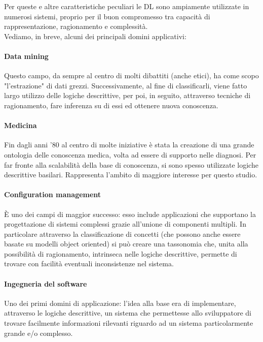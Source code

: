 Per queste e altre caratteristiche peculiari le DL sono ampiamente utilizzate in numerosi
sistemi, proprio per il buon compromesso tra capacità di rappresentazione,
ragionamento e complessità.\\
Vediamo, in breve, alcuni dei principali domini applicativi:

\paragraph{Data mining} 
Questo campo, da sempre al centro di molti dibattiti (anche etici),
ha come scopo "l'estrazione" di dati grezzi. Successivamente, al fine di classificarli,
viene fatto largo utilizzo delle logiche descrittive, per poi,
in seguito, attraverso tecniche di ragionamento, fare inferenza su 
di essi ed ottenere nuova conoscenza.

\paragraph{Medicina}
Fin dagli anni ’80 al centro di molte iniziative è stata la
creazione di una grande ontologia delle conoscenza medica, volta ad essere
di supporto nelle diagnosi. Per far fronte alla scalabilità della base di
conoscenza, si sono spesso utilizzate logiche descrittive basilari.
Rappresenta l'ambito di maggiore interesse per questo studio.

\paragraph{Configuration management}
È uno dei campi di maggior successo: esso include applicazioni che supportano
la progettazione di sistemi complessi grazie  all'unione di componenti multipli.
In particolare attraverso la classificazione di concetti (che possono
anche essere basate su modelli object oriented) si può creare una tassonomia che,
unita alla possibilità di ragionamento, intrinseca nelle logiche
descrittive, permette di trovare con facilità eventuali inconsistenze nel sistema.

\paragraph{Ingegneria del software}
Uno dei primi domini di applicazione: l’idea
alla base era di implementare, attraverso le logiche descrittive, un 
sistema che permettesse allo sviluppatore di trovare facilmente informazioni rilevanti
riguardo ad un sistema particolarmente grande e/o complesso.

